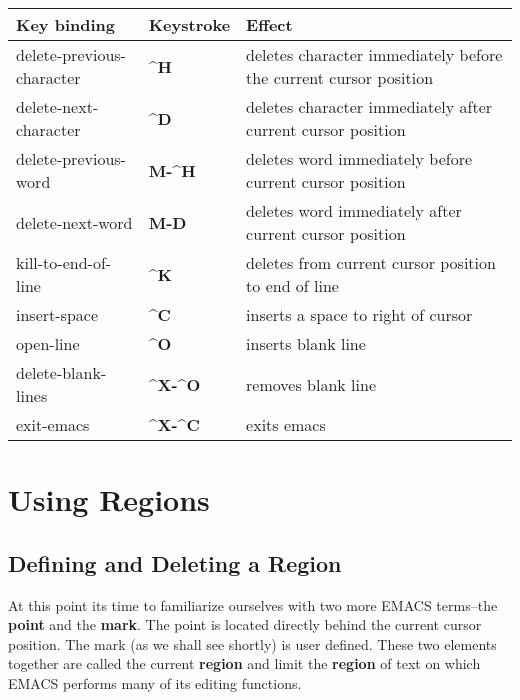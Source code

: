\begin{tabular}{llp{271pt}}
Key binding & Keystroke & Effect\\ \hline

delete-previous-character & {\bf{}\^{}H} & deletes character
immediately before the current cursor position\\

delete-next-character & {\bf{}\^{}D} & deletes character immediately
after current cursor position\\

delete-previous-word & {\bf{}M-\^{}H} & deletes word immediately before
current cursor position\\

delete-next-word & {\bf{}M-D} & deletes word immediately after
current cursor position\\

kill-to-end-of-line & {\bf{}\^{}K} & deletes from current cursor
position to end of line\\

insert-space & {\bf{}\^{}C} & inserts a space to right of cursor\\

open-line & {\bf{}\^{}O} & inserts blank line\\

delete-blank-lines & {\bf{}\^{}X-\^{}O} & removes blank line\\

exit-emacs & {\bf{}\^{}X-\^{}C} & exits emacs\\

\end{tabular}
\chapter{Using Regions}

\section{Defining and Deleting a Region}

At this point its time to familiarize ourselves with two more EMACS
terms--the {\bf{}point} and the {\bf{}mark}.  The point is located directly
  behind the current cursor position.  The mark
(as we shall see shortly) is user defined.  These two elements together
are called the current {\bf{}region} and limit the {\bf{}region} of text on
which EMACS performs many of its editing functions.

